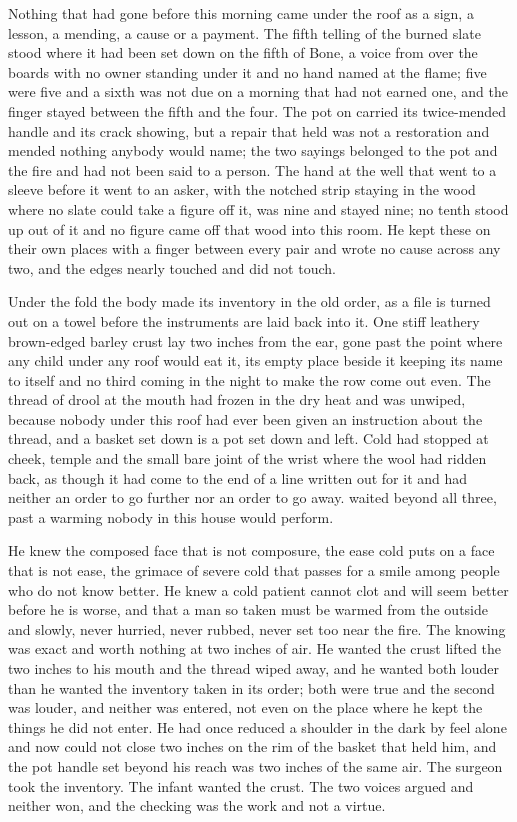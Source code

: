 Nothing that had gone before this morning came under the roof as a sign, a lesson, a mending, a cause or a payment. The fifth telling of the burned slate stood where it had been set down on the fifth of Bone, a voice from  over the boards with no owner standing under it and no hand named at the flame; five were five and a sixth was not due on a morning that had not earned one, and the finger stayed between the fifth and the four. The pot on  carried its twice-mended handle and its crack showing, but a repair that held was not a restoration and mended nothing anybody would name; the two sayings belonged to the pot and the fire and had not been said to a person. The hand at the well that went to a sleeve before it went to an asker, with the notched strip staying in the wood where no slate could take a figure off it, was nine and stayed nine; no tenth stood up out of it and no figure came off that wood into this room. He kept these on their own places with a finger between every pair and wrote no cause across any two, and the edges nearly touched and did not touch.

Under the fold the body made its inventory in the old order, as a file is turned out on a towel before the instruments are laid back into it. One stiff leathery brown-edged barley crust lay two inches from the ear, gone past the point where any child under any roof would eat it, its empty place beside it keeping its name to itself and no third coming in the night to make the row come out even. The thread of drool at the mouth had frozen in the dry heat and was unwiped, because nobody under this roof had ever been given an instruction about the thread, and a basket set down is a pot set down and left. Cold had stopped at cheek, temple and the small bare joint of the wrist where the wool had ridden back, as though it had come to the end of a line written out for it and had neither an order to go further nor an order to go away.  waited beyond all three, past a warming nobody in this house would perform.

He knew the composed face that is not composure, the ease cold puts on a face that is not ease, the grimace of severe cold that passes for a smile among people who do not know better. He knew a cold patient cannot clot and will seem better before he is worse, and that a man so taken must be warmed from the outside and slowly, never hurried, never rubbed, never set too near the fire. The knowing was exact and worth nothing at two inches of air. He wanted the crust lifted the two inches to his mouth and the thread wiped away, and he wanted both louder than he wanted the inventory taken in its order; both were true and the second was louder, and neither was entered, not even on the place where he kept the things he did not enter. He had once reduced a shoulder in the dark by feel alone and now could not close two inches on the rim of the basket that held him, and the pot handle set beyond his reach was two inches of the same air. The surgeon took the inventory. The infant wanted the crust. The two voices argued and neither won, and the checking was the work and not a virtue.

